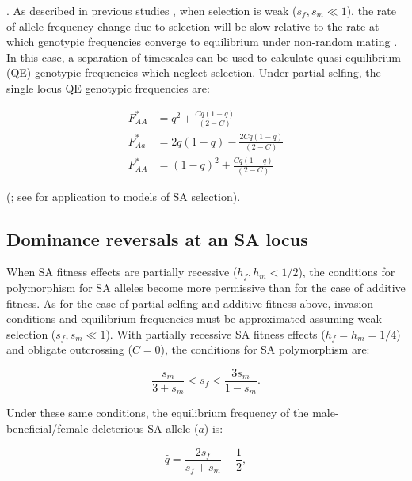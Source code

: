 \documentclass{article}
\begin{document}
\noindent \citep{JordanConnallon2014}. As described in previous studies \citep{JordanConnallon2014,Olito2016}, when selection is weak ($s_f, s_m \ll 1$), the rate of allele frequency change due to selection will be slow relative to the rate at which genotypic frequencies converge to equilibrium under non-random mating \citep{Nagylaki1997}. In this case, a separation of timescales can be used \citep{OttoDay2007} to calculate quasi-equilibrium (QE) genotypic frequencies which neglect selection. Under partial selfing, the single locus QE genotypic frequencies are:

\begin{subequations}
    \begin{align} 
        F^{\ast}_{AA} &= q^2 + \frac{C q (1 - q)}{(2 - C)} \label{eq:partSelfGenoEq1} \\
        F^{\ast}_{Aa} &= 2 q (1 - q) - \frac{2 C q (1 - q)}{(2 - C)}  \label{eq:partSelfGenoEq2}\\
        F^{\ast}_{AA} &= (1 - q)^2 + \frac{C q (1 - q)}{(2 - C) \label{eq:partSelfGenoEq3}}
    \end{align}
\end{subequations}

\noindent (\citealt{CaballeroHill1992}; see \citealt{JordanConnallon2014,Olito2016} for application to models of SA selection).


\subsection*{Dominance reversals at an SA locus}

When SA fitness effects are partially recessive ($h_f,h_m < 1/2$), the conditions for polymorphism for SA alleles become more permissive than for the case of additive fitness. As for the case of partial selfing and additive fitness above, invasion conditions and equilibrium frequencies must be approximated assuming weak selection ($s_f,s_m \ll 1$). With partially recessive SA fitness effects ($h_f = h_m = 1/4$) and obligate outcrossing ($C = 0$), the conditions for SA polymorphism are:

\begin{equation} 
    \frac{s_m}{3 + s_m} < s_f < \frac{3 s_m}{1 - s_m}.
\end{equation}

\noindent Under these same conditions, the equilibrium frequency of the male-beneficial/female-deleterious SA allele ($a$) is:{}

\begin{equation} 
    \hat{q} = \frac{2 s_f}{s_f + s_m} - \frac{1}{2},
\end{equation}
\end{document}
